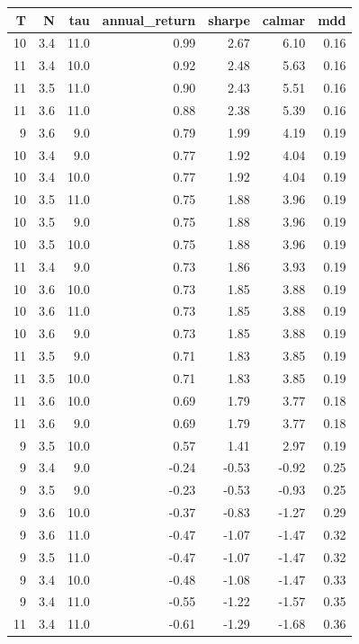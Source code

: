 \documentclass[conference]{IEEEtran}
\begin{document}
\begin{tabular}{rrrrrrr}
\toprule
 T &   N &  tau &  annual\_return &  sharpe &  calmar &  mdd \\
\midrule
10 & 3.4 & 11.0 &           0.99 &    2.67 &    6.10 & 0.16 \\
11 & 3.4 & 10.0 &           0.92 &    2.48 &    5.63 & 0.16 \\
11 & 3.5 & 11.0 &           0.90 &    2.43 &    5.51 & 0.16 \\
11 & 3.6 & 11.0 &           0.88 &    2.38 &    5.39 & 0.16 \\
 9 & 3.6 &  9.0 &           0.79 &    1.99 &    4.19 & 0.19 \\
10 & 3.4 &  9.0 &           0.77 &    1.92 &    4.04 & 0.19 \\
10 & 3.4 & 10.0 &           0.77 &    1.92 &    4.04 & 0.19 \\
10 & 3.5 & 11.0 &           0.75 &    1.88 &    3.96 & 0.19 \\
10 & 3.5 &  9.0 &           0.75 &    1.88 &    3.96 & 0.19 \\
10 & 3.5 & 10.0 &           0.75 &    1.88 &    3.96 & 0.19 \\
11 & 3.4 &  9.0 &           0.73 &    1.86 &    3.93 & 0.19 \\
10 & 3.6 & 10.0 &           0.73 &    1.85 &    3.88 & 0.19 \\
10 & 3.6 & 11.0 &           0.73 &    1.85 &    3.88 & 0.19 \\
10 & 3.6 &  9.0 &           0.73 &    1.85 &    3.88 & 0.19 \\
11 & 3.5 &  9.0 &           0.71 &    1.83 &    3.85 & 0.19 \\
11 & 3.5 & 10.0 &           0.71 &    1.83 &    3.85 & 0.19 \\
11 & 3.6 & 10.0 &           0.69 &    1.79 &    3.77 & 0.18 \\
11 & 3.6 &  9.0 &           0.69 &    1.79 &    3.77 & 0.18 \\
 9 & 3.5 & 10.0 &           0.57 &    1.41 &    2.97 & 0.19 \\
 9 & 3.4 &  9.0 &          -0.24 &   -0.53 &   -0.92 & 0.25 \\
 9 & 3.5 &  9.0 &          -0.23 &   -0.53 &   -0.93 & 0.25 \\
 9 & 3.6 & 10.0 &          -0.37 &   -0.83 &   -1.27 & 0.29 \\
 9 & 3.6 & 11.0 &          -0.47 &   -1.07 &   -1.47 & 0.32 \\
 9 & 3.5 & 11.0 &          -0.47 &   -1.07 &   -1.47 & 0.32 \\
 9 & 3.4 & 10.0 &          -0.48 &   -1.08 &   -1.47 & 0.33 \\
 9 & 3.4 & 11.0 &          -0.55 &   -1.22 &   -1.57 & 0.35 \\
11 & 3.4 & 11.0 &          -0.61 &   -1.29 &   -1.68 & 0.36 \\
\bottomrule
\end{tabular}
\end{document}
